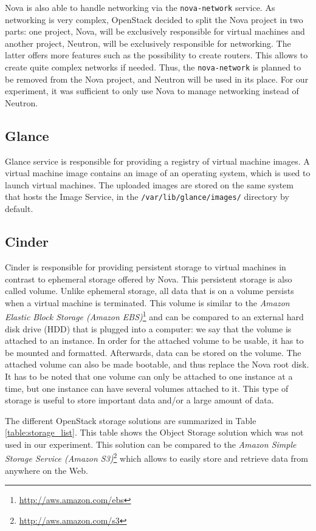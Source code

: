 Nova is also able to handle networking via the \texttt{nova-network} service. 
As networking is very complex, OpenStack decided to split the Nova project in two parts: one project, Nova, will be exclusively responsible for virtual machines and another project, Neutron, will be exclusively responsible for networking. 
The latter offers more features such as the possibility to create routers.
This allows to create quite complex networks if needed.
Thus, the \texttt{nova-network} is planned to be removed from the Nova project, and Neutron will be used in its place.
For our experiment, it was sufficient to only use Nova to manage networking instead of Neutron.






\subsection{Glance}
Glance service is responsible for providing a registry of virtual machine images.
A virtual machine image contains an image of an operating system, which is used to launch virtual machines. 
The uploaded images are stored on the same system that hosts the Image Service, in the \texttt{/var/lib/glance/images/} directory by default.

\subsection{Cinder}
Cinder is responsible for providing persistent storage to virtual machines in contrast to ephemeral storage offered by Nova. 
This persistent storage is also called volume. 
Unlike ephemeral storage, all data that is on a volume persists when a virtual machine is terminated. 
This volume is similar to the \textit{Amazon Elastic Block Storage (Amazon EBS)}\footnote{\url{http://aws.amazon.com/ebs}} 
and can be compared to an external hard disk drive (HDD) that is plugged into a computer: we say that the volume is attached to an instance. 
In order for the attached volume to be usable, it has to be mounted and formatted. 
Afterwards, data can be stored on the volume. 
The attached volume can also be made bootable, and thus replace the Nova root disk.
It has to be noted that one volume can only be attached to one instance at a time, but one instance can have several volumes attached to it.
This type of storage is useful to store important data and/or a large amount of data.

The different OpenStack storage solutions are summarized in Table \ref{table:storage_list}. 
This table shows the Object Storage solution which was not used in our experiment. 
This solution can be compared to the \textit{Amazon Simple Storage Service (Amazon S3)}\footnote{\url{http://aws.amazon.com/s3}} which allows to easily store and retrieve data from anywhere on the Web.

